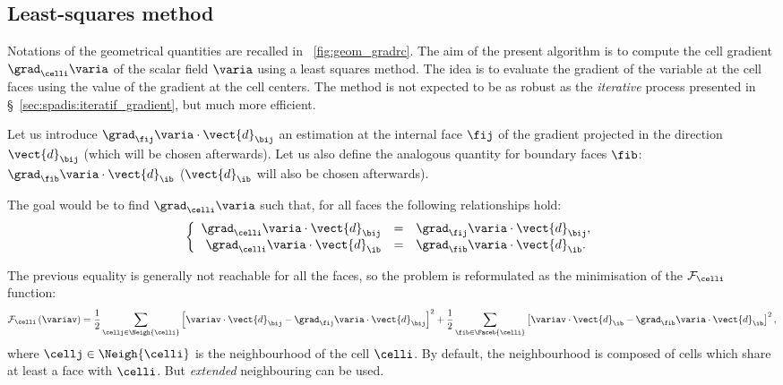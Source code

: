 \subsection{Least-squares method}\label{sec:spadis:least_squares_gradient}
%
Notations of the geometrical quantities are recalled in \figurename~\ref{fig:geom_gradrc}.
The aim of the present algorithm is to compute the cell gradient $\grad_{\celli} \varia $ of the scalar field $\varia$
using a least squares method.
The idea is to evaluate the gradient of the variable at the cell faces using the value of the gradient at the cell centers.
The method is not expected to be as robust as the \emph{iterative} process presented in \S~\ref{sec:spadis:iteratif_gradient},
but much more efficient.

Let us introduce $\grad_{\fij} \varia \cdot \vect{d}_{\bij}$  an estimation at the internal face $\fij$
of the gradient projected in the direction $\vect{d}_{\bij}$ (which will be chosen afterwards).
Let us also define the analogous quantity for boundary faces $\fib$: $\grad_{\fib} \varia \cdot \vect{d}_\ib$
 ($\vect{d}_\ib$ will also be chosen afterwards).

The goal would be to find $\grad_{\celli} \varia $ such that, for all faces
the following relationships hold:
\begin{equation}
\left\{\begin{array}{r c l}
\grad_{\celli} \varia  \cdot \vect{d}_{\bij} &=& \grad_{\fij} \varia \cdot \vect{d}_{\bij} , \\
\grad_{\celli} \varia  \cdot \vect{d}_\ib &=& \grad_{\fib} \varia \cdot \vect{d}_\ib .
\end{array}\right.
\end{equation}

The previous equality is generally not reachable for all the faces, so the
problem is reformulated as the minimisation of the $\mathcal{F}_{\celli}$ function:
%
\begin{equation}\label{eq:spadis:gradmc_function}
\mathcal{F}_{\celli}
\left( \variav \right) =
\dfrac{1}{2}\sum\limits_{\cellj \in \Neigh{\celli}  }\left[
 \variav   \cdot \vect{d}_{\bij}  -  \grad_{\fij} \varia   \cdot \vect{d}_{\bij}
\right]^2+
\dfrac{1}{2}\sum\limits_{ \fib \in \Faceb{\celli}}\left[
 \variav   \cdot \vect{d}_\ib  -  \grad_{\fib} \varia   \cdot \vect{d}_\ib
\right]^2,
\end{equation}
where $\cellj \in \Neigh{\celli} $ is the neighbourhood of the cell $\celli$. By default, the neighbourhood is composed of
cells which share at least a face with $\celli$. But \emph{extended} neighbouring can be used.

